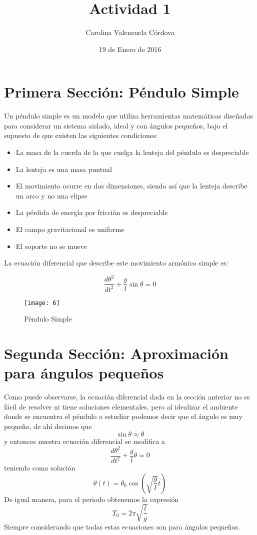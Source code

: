\documentclass[12 pt,twocolumn]{article}
\begin{document}
\title{Actividad 1}
\author{Carolina Valenzuela Córdova}
\date{19 de Enero de 2016}
\maketitle
\newpage

\section{\small Primera Sección: Péndulo Simple}
Un péndulo simple es un modelo que utiliza herramientas matemáticas diseñadas para  considerar un sistema aislado, ideal y con ángulos pequeños, bajo el supuesto de que existen las siguientes condiciones:
\begin{itemize}
\item La masa de la cuerda de la que cuelga la lenteja del péndulo es despreciable
\item La lenteja es una masa puntual
\item El movimiento ocurre en dos dimensiones, siendo así que la lenteja describe un arco y no una elipse
\item La pérdida de energía por fricción es despreciable
\item El campo gravitacional es uniforme
\item El soporte no se mueve
\end{itemize}
La ecuación diferencial que describe este movimiento armónico simple es:

$$\frac{d\theta^2}{dt^2}+\frac{g}{l}\sin\theta=0 $$

\begin{figure}[H]
\centering
\texttt{[image: 6]}
\caption{\footnotesize Péndulo Simple}
\end{figure}

\section{\small Segunda Sección: Aproximación\\ 
para ángulos pequeños}
Como puede observarse, la ecuación diferencial dada en la sección anterior no es fácil de resolver ni tiene soluciones elementales, pero al idealizar el ambiente donde se encuentra el péndulo a estudiar podemos decir que el ángulo es muy pequeño, de ahí decimos que $$\sin\theta\approx\theta$$
y entonces nuestra ecuación diferencial se modifica a $$\frac{d\theta^2}{dt^2}+\frac{g}{l}\theta=0 $$
teniendo como solución $$\theta(t)=\theta_0\cos(\sqrt{\frac{g}{l}}t)$$
De igual manera, para el periodo obtenemos la expresión $$T_0= 2\pi\sqrt{\frac{l}{g}}$$
Siempre considerando que todas estas ecuaciones son para ángulos pequeños.
\end{document}
